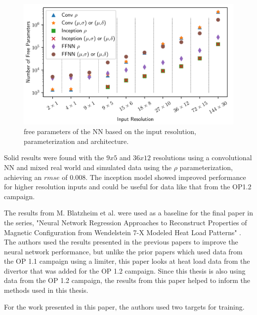 \begin{figure}[!htb]
    \centering
    \includegraphics[width = \textwidth]{images/daniel-input-parameters.png}
    \caption{free parameters of the NN based on the input resolution, parameterization and architecture.} \label{fig:daniel-input-parameters}
\end{figure}

Solid results were found with the $9x5$ and $36x12$ resolutions using a convolutional NN and mixed real world and simulated data using the $\rho$ parameterization, achieving an $rmse$ of 0.008. The inception model showed improved performance for higher resolution inputs and could be useful for data like that from the OP1.2 campaign.

The results from M. Blatzheim et al. were used as a baseline for the final paper in the series, "Neural Network Regression Approaches to Reconstruct Properties of Magnetic Configuration from Wendelstein 7-X Modeled Heat Load Patterns" \cite{Blatzheim_2019}. The authors used the results presented in the previous papers to improve the neural network performance, but unlike the prior papers which used data from the OP 1.1 campaign using a limiter, this paper looks at heat load data from the divertor that was added for the OP 1.2 campaign. Since this thesis is also using data from the OP 1.2 campaign, the results from this paper helped to inform the methods used in this thesis.

For the work presented in this paper, the authors used two targets for training.


